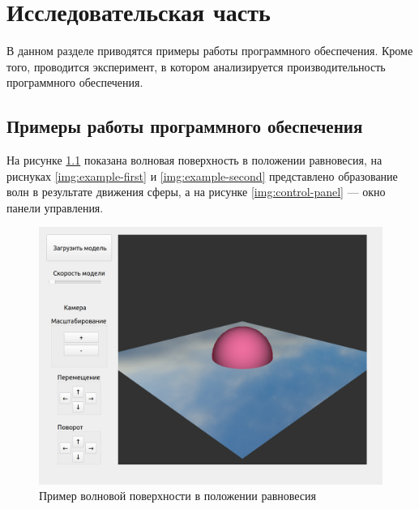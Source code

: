 \chapter{Исследовательская часть}

В данном разделе приводятся примеры работы программного обеспечения. Кроме того, проводится эксперимент, в котором анализируется производительность программного обеспечения.

\section{Примеры работы программного обеспечения}

На рисунке \ref{img:example-start} показана волновая поверхность в положении равновесия, на риснуках \ref{img:example-first} и \ref{img:example-second} представлено образование волн в результате движения сферы, а на рисунке \ref{img:control-panel} --- окно панели управления.

\begin{figure}[H]
	\begin{center}
		\includegraphics[scale=0.25]{img/example-start.png}
	\end{center}
	\captionsetup{justification=centering}
	\caption{Пример волновой поверхности в положении равновесия}
	\label{img:example-start}
\end{figure}

